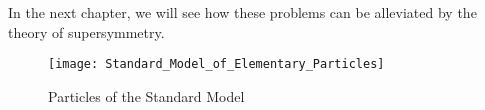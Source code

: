 In the next chapter, we will see how these problems can be alleviated by the theory of supersymmetry.

\begin{figure}[tbp]
\caption{Particles of the Standard Model} \label{fig:sm_particles}
\texttt{[image: Standard\_Model\_of\_Elementary\_Particles]}
\end{figure}









